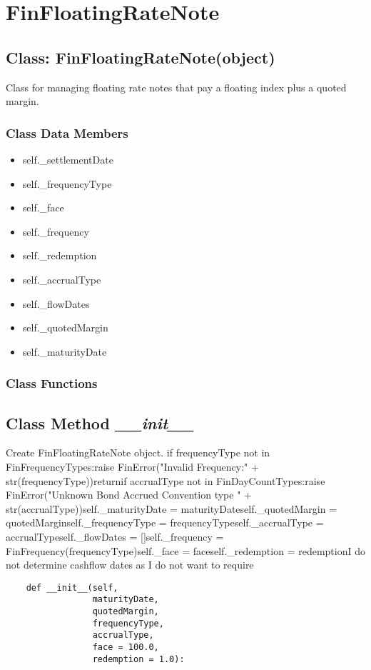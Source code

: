 \documentclass[twoside,11pt]{book}
\begin{document}
\newpage
\section{FinFloatingRateNote}

\subsection{Class: FinFloatingRateNote(object)}
Class for managing floating rate notes that pay a floating index plus a quoted margin.

\subsubsection{Class Data Members}
\begin{itemize}
\item{self.\_settlementDate}
\item{self.\_frequencyType}
\item{self.\_face}
\item{self.\_frequency}
\item{self.\_redemption}
\item{self.\_accrualType}
\item{self.\_flowDates}
\item{self.\_quotedMargin}
\item{self.\_maturityDate}
\end{itemize}

\subsubsection{Class Functions}

\subsection{Class Method {\it \_\_init\_\_}}
Create FinFloatingRateNote object. if frequencyType not in FinFrequencyTypes:raise FinError("Invalid Frequency:" + str(frequencyType))returnif accrualType not in FinDayCountTypes:raise FinError("Unknown Bond Accrued Convention type " + str(accrualType))self.\_maturityDate = maturityDateself.\_quotedMargin = quotedMarginself.\_frequencyType = frequencyTypeself.\_accrualType = accrualTypeself.\_flowDates = []self.\_frequency = FinFrequency(frequencyType)self.\_face = faceself.\_redemption = redemptionI do not determine cashflow dates as I do not want to require

\begin{lstlisting}
    def __init__(self, 
                 maturityDate,
                 quotedMargin,
                 frequencyType, 
                 accrualType,
                 face = 100.0, 
                 redemption = 1.0):
\end{lstlisting}
\end{document}

